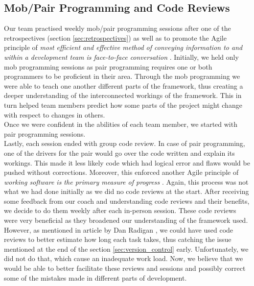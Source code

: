 \documentclass{l3proj}
\begin{document}
        
        
    \subsection{Mob/Pair Programming and Code Reviews}
    \label{sec:mob}
        Our team practised weekly mob/pair programming sessions after one of the retrospectives (section \ref{sec:retrospectives}) as well as to promote the Agile principle of \textit{most efficient and effective method of conveying information to and within a development team is face-to-face conversation} \cite{manifesto}. Initially, we held only mob programming sessions as pair programming requires one or both programmers to be proficient in their area. Through the mob programming we were able to teach one another different parts of the framework, thus creating a deeper understanding of the interconnected workings of the framework. This in turn helped team members predict how some parts of the project might change with respect to changes in others.\\
        Once we were confident in the abilities of each team member, we started with pair programming sessions.\\
        Lastly, each session ended with group code review. In case of pair programming, one of the drivers for the pair would go over the code written and explain its workings. This made it less likely code which had logical error and flaws would be pushed without corrections. Moreover, this enforced another Agile principle of \textit{working software is the primary measure of progress} \cite{manifesto}. Again, this process was not what we had done initially as we did no code reviews at the start. After receiving some feedback from our coach and understanding code reviews and their benefits, we decide to do them weekly after each in-person session. These code reviews were very beneficial as they broadened our understanding of the framework used. However, as mentioned in article by Dan Radigan \cite{code_review}, we could have used code reviews to better estimate how long each task takes, thus catching the issue mentioned at the end of the section \ref{sec:version_control} early. Unfortunately, we did not do that, which cause an inadequate work load. Now, we believe that we would be able 
        to better facilitate these reviews and sessions and possibly correct some of the mistakes made in different parts of development.\\
        
\end{document}
